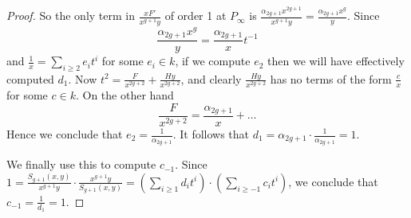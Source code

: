 \documentclass[draft, 11pt]{article} %
\theoremstyle{plain}
\theoremstyle{remark}
\begin{document}
\begin{proof}
So the only term in $\frac{xF'}{x^{g+1}y}$ of order 1 at $P_\infty$ is $\frac{\alpha_{2g+1}x^{2g+1}}{x^{g+1}y} = \frac{\alpha_{2g+1}x^{g}}{y}$.
Since
\[
\frac{\alpha_{2g+1}x^g}{y} = \frac{\alpha_{2g+1}}{x}t^{-1}
\]
and $\frac{1}{x} = \sum_{i\geq 2}e_it^i$ for some $e_i \in k$, if we compute $e_2$ then we will have effectively computed $d_1$.
Now $t^2 = \frac{F }{x^{2g+2}}+ \frac{Hy}{x^{2g+2}}$, and clearly $\frac{Hy}{x^{2g+2}}$ has no terms of the form $\frac{c}{x}$ for some $c \in k$.
On the other hand
\[
\frac{F}{x^{2g+2}} = \frac{\alpha_{2g+1}}{x} + \ldots
\]
Hence we conclude that $e_2 = \frac{1}{\alpha_{2g+1}}$.
It follows that $d_1 = \alpha_{2g+1} \cdot \frac{1}{\alpha_{2g+1}} = 1$.


We finally use this to compute $c_{-1}$.
Since $1 = \frac{S_{g+1}(x,y)}{x^{g+1}y}\cdot \frac{x^{g+1}y}{S_{g+1}(x,y)} = \left( \sum_{i\geq 1}d_it^i \right) \cdot \left( \sum_{i\geq -1}c_it^i\right)$, we conclude that $c_{-1} = \frac{1}{d_{1}} = 1$.




\end{proof}



\begin{comment}
We define $\alpha^i_j$ and $\Alpha^i_{j+1}$ for $0 \leq j \leq 2g$, and $B_k^i$ for $1\leq k \leq g$, such that
\[
$s_i(x) = \alpha^i_{2g}x^{2g} + \ldots + \alpha^i_0 \ {\rm and } \ S_i(x) = A_{2g+1}^ix^{2g+1} + \ldots + A^i_1 x + y(B_g^i x^i + \ldots + B_1^i x).
\]
\end{comment}






\end{document}

